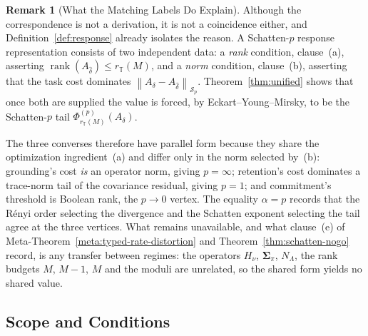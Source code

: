 \documentclass[12pt]{article}
\theoremstyle{definition}
\newtheorem{remark}[theorem]{Remark}
\DeclareMathOperator{\rank}{rank}
\newcommand{\norm}[1]{\left\lVert#1\right\rVert}
\newcommand{\Sp}[1]{\mathcal S_{#1}}
\begin{document}
\begin{remark}[What the Matching Labels Do Explain]
\label{rem:vertex-two-ingredients}
Although the correspondence is not a derivation, it is not a coincidence
either, and Definition~\ref{def:response} already isolates the reason.  A
Schatten-$p$ response representation consists of two independent data: a
\emph{rank} condition, clause~(a), asserting
$\rank(A_{\widehat\delta})\le r_{\mathbb T}(M)$, and a \emph{norm} condition,
clause~(b), asserting that the task cost dominates
$\norm{A_\delta-A_{\widehat\delta}}_{\Sp p}$.  Theorem~\ref{thm:unified}
shows that once both are supplied the value is forced, by
Eckart--Young--Mirsky, to be the Schatten-$p$ tail
$\Phi^{(p)}_{r_{\mathbb T}(M)}(A_\delta)$.

The three converses therefore have parallel form because they share the
optimization ingredient~(a) and differ only in the norm selected by~(b):
grounding's cost \emph{is} an operator norm, giving $p=\infty$; retention's
cost dominates a trace-norm tail of the covariance residual, giving $p=1$; and
commitment's threshold is Boolean rank, the $p\to0$ vertex.  The equality
$\alpha=p$ records that the R\'enyi order selecting the divergence and the
Schatten exponent selecting the tail agree at the three vertices.  What remains
unavailable, and what clause~(e) of
Meta-Theorem~\ref{meta:typed-rate-distortion} and
Theorem~\ref{thm:schatten-nogo} record, is any transfer between regimes: the
operators $H_\nu$, $\bm{\Sigma}_\pi$, $N_\Lambda$, the rank budgets $M$, $M-1$, $M$
and the moduli are unrelated, so the shared form yields no shared value.
\end{remark}

\subsection{Scope and Conditions}
\label{subsec:exponent-scope}
\end{document}
